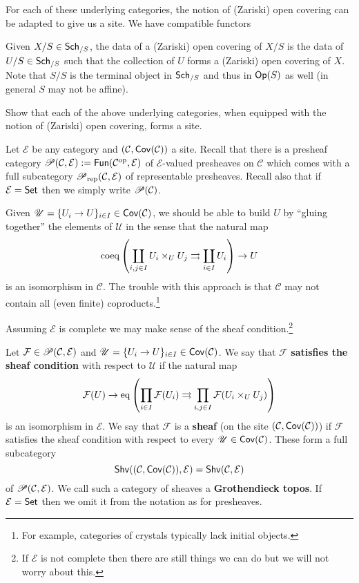 \documentclass[11pt]{article}
\newcommand{\CC}{\mathcal{C}}
\renewcommand{\F}{\mathcal{F}}
\newcommand{\EE}{\mathcal{E}}
\newcommand{\U}{\mathscr{U}}
\begin{document}
For each of these underlying categories, the notion of (Zariski) open covering can be adapted to give us a site. We have compatible functors
\begin{center}
\end{center}
Given $X/S\in\operatorname{\mathsf{Sch}}_{/S}$, the data of a (Zariski) open covering of $X/S$ is the data of $U/S\in\operatorname{\mathsf{Sch}}_{/S}$ such that the collection of $U$ forms a (Zariski) open covering of $X$. Note that $S/S$ is the terminal object in $\operatorname{\mathsf{Sch}}_{/S}$ and thus in $\operatorname{\mathsf{Op}}(S)$ as well (in general $S$ may not be affine).

\begin{exercise}
Show that each of the above underlying categories, when equipped with the notion of (Zariski) open covering, forms a site.
\end{exercise}

Let $\EE$ be any category and $(\CC,\Cov(\CC))$ a site. Recall that there is a presheaf category $\Pre(\CC,\EE):=\Fun(\CC^{\op},\EE)$ of $\EE$-valued presheaves on $\CC$ which comes with a full subcategory $\Pre_{\rep}(\CC,\EE)$ of representable presheaves. Recall also that if $\EE=\Set$ then we simply write $\Pre(\CC)$.

\begin{remark}
Given $\U=\{U_i\to U\}_{i\in I}\in\Cov(\CC)$, we should be able to build $U$ by ``gluing together'' the elements of $\U$ in the sense that the natural map
$$\operatorname{coeq}\left(\coprod_{i,j\in I}U_i\times_UU_j\rightrightarrows\coprod_{i\in I}U_i\right)\to U$$
is an isomorphism in $\CC$. The trouble with this approach is that $\CC$ may not contain all (even finite) coproducts.\footnote{For example, categories of crystals typically lack initial objects.}
\end{remark}

Assuming $\EE$ is complete we may make sense of the sheaf condition.\footnote{If $\EE$ is not complete then there are still things we can do but we will not worry about this.}

\begin{definition}
Let $\F\in\Pre(\CC,\EE)$ and $\U=\{U_i\to U\}_{i\in I}\in\Cov(\CC)$. We say that $\F$ \textbf{satisfies the sheaf condition} with respect to $\U$ if the natural map 
$$\F(U)\to\eq\paren{\prod_{i\in I}\F(U_i)\rightrightarrows\prod_{i,j\in I}\F(U_i\times_UU_j)}$$
is an isomorphism in $\EE$. We say that $\F$ is a \textbf{sheaf} (on the site $(\CC,\Cov(\CC))$) if $\F$ satisfies the sheaf condition with respect to every $\U\in\Cov(\CC)$. These form a full subcategory 
$$\Shv((\CC,\Cov(\CC)),\EE)=\Shv(\CC,\EE)$$ 
of $\Pre(\CC,\EE)$. We call such a category of sheaves a \textbf{Grothendieck topos}. If $\EE=\Set$ then we omit it from the notation as for presheaves.
\end{definition}
\end{document}
